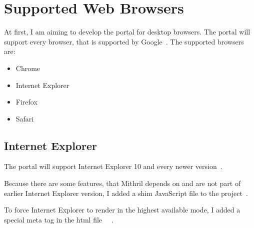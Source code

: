 \section{Supported Web Browsers}
At first, I am aiming to develop the portal for desktop browsers. The portal will support every browser, that is supported by Google~\cite{google-support}.
The supported browsers are:
\begin{itemize}
	\item Chrome
	\item Internet Explorer
	\item Firefox
	\item Safari
\end{itemize}

\subsection{Internet Explorer}
The portal will support Internet Explorer 10 and every newer version~\cite{google-support-blog}.

Because there are some features, that Mithril depends on and are not part of earlier Internet Explorer version, I added a shim JavaScript file to the project~\cite{Mithril-tools}. 

To force Internet Explorer to render in the highest available mode, I added a special meta tag in the html file~\cite{IE10-microsoft}~\cite{IE10-html5-boiler} .
